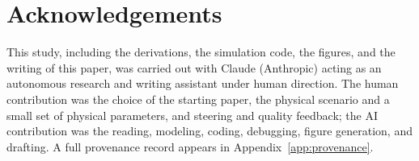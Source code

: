 \documentclass{article}
\begin{document}
\section*{Acknowledgements}
This study, including the derivations, the simulation code, the figures, and the writing of this
paper, was carried out with Claude (Anthropic) acting as an autonomous research and writing
assistant under human direction. The human contribution was the choice of the starting paper, the
physical scenario and a small set of physical parameters, and steering and quality feedback;
the AI contribution was the reading, modeling, coding, debugging, figure generation, and drafting.
A full provenance record appears in Appendix~\ref{app:provenance}.




\appendix

\end{document}
